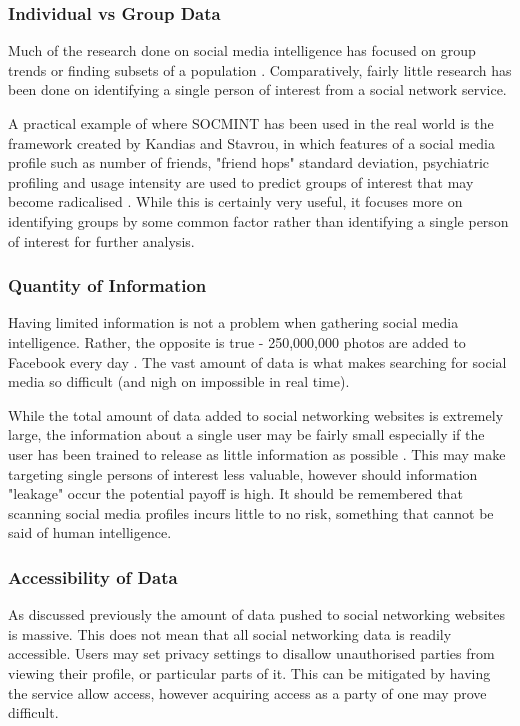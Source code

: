 \documentclass[12pt]{article}
\begin{document}
\subsubsection{Individual vs Group Data}
Much of the research done on social media intelligence has focused on group trends or finding subsets of a population \citep{socmintpublicsafety}\citep{socmintoverview}. Comparatively, fairly little research has been done on identifying a single person of interest from a social network service.

A practical example of where SOCMINT has been used in the real world is the framework created by Kandias and Stavrou, in which features of a social media profile such as number of friends, "friend hops" standard deviation, psychiatric profiling and usage intensity are used to predict groups of interest that may become radicalised \citep{behaviourdetection}. While this is certainly very useful, it focuses more on identifying groups by some common factor rather than identifying a single person of interest for further analysis.

\subsubsection{Quantity of Information}
Having limited information is not a problem when gathering social media intelligence. Rather, the opposite is true - 250,000,000 photos are added to Facebook every day \citep{socmintoverview}. The vast amount of data is what makes searching for social media so difficult (and nigh on impossible in real time).

While the total amount of data added to social networking websites is extremely large, the information about a single user may be fairly small especially if the user has been trained to release as little information as possible \citep{behaviourdetection}. This may make targeting single persons of interest less valuable, however should information "leakage" occur the potential payoff is high. It should be remembered that scanning social media profiles incurs little to no risk, something that cannot be said of human intelligence.

\subsubsection{Accessibility of Data}
As discussed previously the amount of data pushed to social networking websites is massive. This does not mean that all social networking data is readily accessible. Users may set privacy settings to disallow unauthorised parties from viewing their profile, or particular parts of it. This can be mitigated by having the service allow access, however acquiring access as a party of one may prove difficult.
\end{document}
